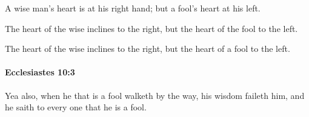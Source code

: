 			\begin{versebox}
					\item[BHS] 
					\item[LXX] 
					\item[ASV] A wise man's heart is at his right hand; but a fool's heart at his left.
					\item[NIV] The heart of the wise inclines to the right, but the heart of the fool to the left.
					\item[NRSV] The heart of the wise inclines to the right, but the heart of a fool to the left.
			\end{versebox}

		\paragraph{Ecclesiastes 10:3} %
			\label{ECCLESIASTES-10-3}

			Yea also, when he that is a fool walketh by the way, his wisdom faileth him, and he saith to every one that he is a fool.

